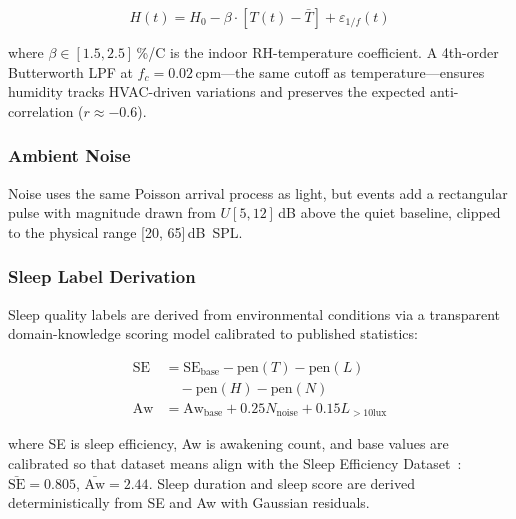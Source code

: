 \documentclass[11pt,a4paper,twocolumn]{article}
\begin{document}
\begin{equation}
  H(t) = H_0 - \beta \cdot [T(t) - \bar{T}] + \varepsilon_{1/f}(t)
\end{equation}


where $\beta \in [1.5, 2.5]$\,\%/\textdegree C is the indoor RH-temperature
coefficient.  A 4th-order Butterworth LPF at $f_c = 0.02$\,cpm---the same
cutoff as temperature---ensures humidity tracks HVAC-driven variations and
preserves the expected anti-correlation ($r \approx -0.6$).

\subsubsection{Ambient Noise}


Noise uses the same Poisson arrival process as light, but events add a
rectangular pulse with magnitude drawn from $U[5, 12]$\,dB above the quiet
baseline, clipped to the physical range [20, 65]\,dB~SPL.

\subsubsection{Sleep Label Derivation}

Sleep quality labels are derived from environmental conditions via a transparent
domain-knowledge scoring model calibrated to published statistics:

\begin{align}
  \text{SE} &= \text{SE}_{\text{base}} - \text{pen}(T) - \text{pen}(L) \nonumber \\
            &\quad - \text{pen}(H) - \text{pen}(N) \label{eq:se} \\
  \text{Aw} &= \text{Aw}_{\text{base}} + 0.25 N_{\text{noise}}
               + 0.15 L_{>10\text{lux}} \label{eq:aw}
\end{align}


where SE is sleep efficiency, Aw is awakening count, and base values are
calibrated so that dataset means align with the Sleep Efficiency
Dataset~\citep{kaggle2023}:
$\bar{\text{SE}} = 0.805$, $\bar{\text{Aw}} = 2.44$.
Sleep duration and sleep score are derived deterministically from SE and Aw
with Gaussian residuals.
\end{document}
